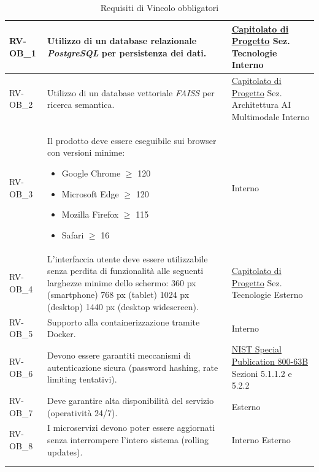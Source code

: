 \begin{longtable}{|>{\raggedright}p{}|>{\raggedright\arraybackslash}p{}|>{\raggedright\arraybackslash}p{}|}
    RV-OB\_1 & Utilizzo di un database relazionale \textit{PostgreSQL} per persistenza dei dati. &  \href{https://www.math.unipd.it/~tullio/IS-1/2025/Progetto/C8.pdf}{Capitolato di Progetto} \newline Sez. Tecnologie \newline Interno \\
    \hline
    RV-OB\_2 & Utilizzo di un database vettoriale \textit{FAISS} per ricerca semantica. & \href{https://www.math.unipd.it/~tullio/IS-1/2025/Progetto/C8.pdf}{Capitolato di Progetto} \newline Sez. Architettura AI Multimodale \newline Interno \\
    \hline
    RV-OB\_3 & Il prodotto deve essere eseguibile sui browser con versioni minime: \begin{itemize}
        \item Google Chrome $\ge$ 120
        \item Microsoft Edge $\ge$ 120
        \item Mozilla Firefox $\ge$ 115
        \item Safari $\ge$ 16
    \end{itemize} & Interno \\
    \hline
    RV-OB\_4 & L'interfaccia utente deve essere utilizzabile senza perdita di funzionalità alle seguenti larghezze minime dello schermo: 360 px (smartphone) 768 px (tablet) 1024 px (desktop) 1440 px (desktop widescreen). &  \href{https://www.math.unipd.it/~tullio/IS-1/2025/Progetto/C8.pdf}{Capitolato di Progetto} \newline Sez. Tecnologie \newline Esterno \\
    \hline
    RV-OB\_5 & Supporto alla containerizzazione tramite Docker. & Interno \\
    \hline
    RV-OB\_6 & Devono essere garantiti meccanismi di autenticazione sicura (password hashing, rate limiting tentativi). & \href{https://pages.nist.gov/800-63-3/sp800-63b.html#sfcs}{NIST Special Publication 800-63B} Sezioni 5.1.1.2 e 5.2.2 \\
    \hline
    RV-OB\_7 & Deve garantire alta disponibilità del servizio (operatività 24/7). & Esterno \\
    \hline
    RV-OB\_8 & I microservizi devono poter essere aggiornati senza interrompere l'intero sistema (rolling updates). & Interno \newline Esterno \\
    \hline
    
    \multicolumn{3}{c}{} \\
    \caption{Requisiti di Vincolo obbligatori}\label{tab:vincolo_obbligatori}\\
\end{longtable}
